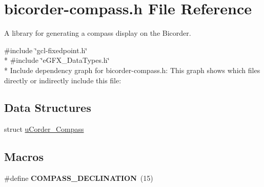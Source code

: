 \hypertarget{bicorder-compass_8h}{}\section{bicorder-\/compass.h File Reference}
\label{bicorder-compass_8h}


A library for generating a compass display on the Bicorder.  


{\ttfamily \#include \char`\"{}gcl-\/fixedpoint.\+h\char`\"{}}\\*
{\ttfamily \#include \char`\"{}e\+G\+F\+X\+\_\+\+Data\+Types.\+h\char`\"{}}\\*
Include dependency graph for bicorder-\/compass.h\+:
This graph shows which files directly or indirectly include this file\+:
\subsection*{Data Structures}
\begin{DoxyCompactItemize}
\item 
struct \hyperlink{structuCorder__Compass}{u\+Corder\+\_\+\+Compass}
\end{DoxyCompactItemize}
\subsection*{Macros}
\begin{DoxyCompactItemize}
\item 
\#define {\bfseries C\+O\+M\+P\+A\+S\+S\+\_\+\+D\+E\+C\+L\+I\+N\+A\+T\+I\+ON}~(15)\hypertarget{bicorder-compass_8h_ae36b72028ffc628f320aba81b702036d}{}\label{bicorder-compass_8h_ae36b72028ffc628f320aba81b702036d}

\end{DoxyCompactItemize}
